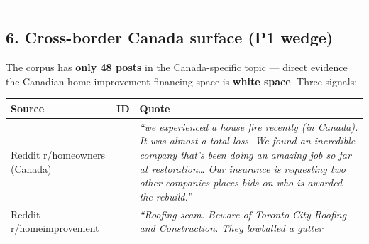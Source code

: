\documentclass[
  10pt,
]{article}
\let\origtexttt\texttt
\renewcommand{\texttt}[1]{\origtexttt{\seqsplit{#1}}}
\begin{document}
\begin{center}\rule{0.5\linewidth}{0.5pt}\end{center}

\hypertarget{cross-border-canada-surface-p1-wedge}{%
\subsection{6. Cross-border Canada surface (P1 wedge)}\label{cross-border-canada-surface-p1-wedge}}

The corpus has \textbf{only 48 posts} in the Canada-specific topic --- direct evidence the Canadian
home-improvement-financing space is \textbf{white space}. Three signals:

\begin{longtable}[]{@{}lll@{}}
\toprule
\begin{minipage}[b]{0.27\columnwidth}\raggedright
Source\strut
\end{minipage} & \begin{minipage}[b]{0.19\columnwidth}\raggedright
ID\strut
\end{minipage} & \begin{minipage}[b]{0.46\columnwidth}\raggedright
Quote\strut
\end{minipage}\tabularnewline
\midrule
\endhead
\begin{minipage}[t]{0.27\columnwidth}\raggedright
Reddit r/homeowners (Canada)\strut
\end{minipage} & \begin{minipage}[t]{0.19\columnwidth}\raggedright
\texttt{1ndefiv}\strut
\end{minipage} & \begin{minipage}[t]{0.46\columnwidth}\raggedright
\emph{``we experienced a house fire recently (in Canada). It was almost a total loss. We found an
incredible company that's been doing an amazing job so far at restoration\ldots{} Our insurance is
requesting two other companies places bids on who is awarded the rebuild.''}\strut
\end{minipage}\tabularnewline
\begin{minipage}[t]{0.27\columnwidth}\raggedright
Reddit r/homeimprovement\strut
\end{minipage} & \begin{minipage}[t]{0.19\columnwidth}\raggedright
\texttt{1sqbaiv}\strut
\end{minipage} & \begin{minipage}[t]{0.46\columnwidth}\raggedright
\emph{``Roofing scam. Beware of Toronto City Roofing and Construction. They lowballed a gutter
}
\end{minipage}
\end{longtable}
\end{document}
